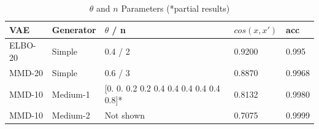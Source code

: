 \documentclass{article}
\begin{document}
\begin{table}[h]
  \caption{$\theta$ and $n$ Parameters (*partial results)}
  \label{theta}
  \centering
  \begin{tabular}{lllll}
    \toprule
    VAE     & Generator     & $\theta$ / n & $cos(x,x')$ & acc \\
    \midrule
    ELBO-20 & Simple  & 0.4 / 2 & 0.9200 & 0.995 \\
    MMD-20 & Simple &  0.6 / 3  & 0.8870 & 0.9968 \\
    MMD-10 & Medium-1 & [0.  0.  0.2 0.2 0.4 0.4 0.4 0.4 0.4 0.8]* & 0.8132 & 0.9980 \\
    MMD-10 & Medium-2 & Not shown & 0.7075 & 0.9999 \\
    \bottomrule
  \end{tabular}
\end{table}
\end{document}
